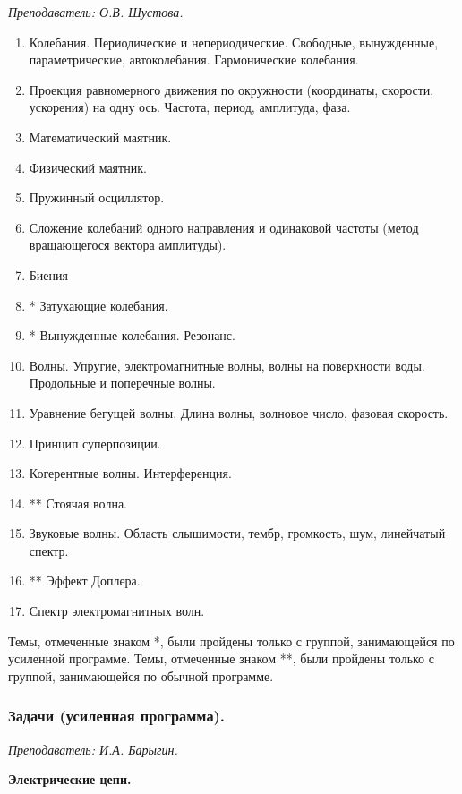 \documentclass[12pt]{article}
\newlength{\h}
\newlength{\x}
\begin{document}
\textit{Преподаватель: О.В. Шустова.}\\

\begin{enumerate}
\item Колебания. Периодические и непериодические. Свободные,
  вынужденные, параметрические, автоколебания. Гармонические
  колебания.
\item Проекция равномерного движения по окружности (координаты,
  скорости, ускорения) на одну ось. Частота, период, амплитуда, фаза.
\item Математический маятник.
\item Физический маятник.
\item Пружинный осциллятор.
\item Сложение колебаний одного направления и одинаковой частоты
  (метод вращающегося вектора амплитуды).
\item Биения
\item * Затухающие колебания.
\item * Вынужденные колебания. Резонанс.
\item Волны. Упругие, электромагнитные волны, волны на поверхности
  воды. Продольные и поперечные волны.
\item Уравнение бегущей волны. Длина волны, волновое число, фазовая скорость.
\item Принцип суперпозиции.
\item Когерентные волны. Интерференция.
\item ** Стоячая волна.
\item Звуковые волны. Область слышимости, тембр, громкость, шум, линейчатый спектр.
\item **  Эффект Доплера.
\item Спектр электромагнитных волн. 
\end{enumerate}

Темы, отмеченные знаком *, были пройдены только с группой,
занимающейся по усиленной программе. Темы, отмеченные знаком **, были
пройдены только с группой, занимающейся по обычной программе. 

\subsubsection{Задачи (усиленная программа).}
\label{sec:daily10pr-hard}

\textit{Преподаватель: И.А. Барыгин.}\\

\begin{center}
  \textbf{Электрические цепи. }
\end{center}
\end{document}
